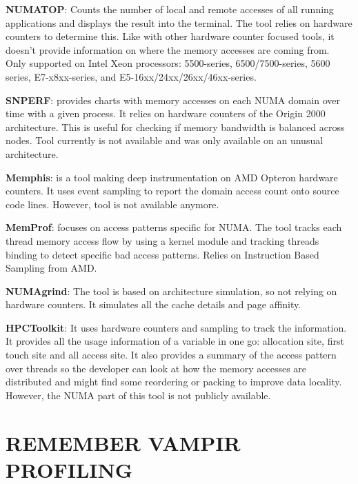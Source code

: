 \documentclass[a4paper,11pt]{article}
\begin{document}
\begin{description}
\item \textbf{NUMATOP}: Counts the number of local and remote accesses of all running applications and displays the result into the terminal. The tool relies on hardware counters to determine this. Like with other hardware counter focused tools, it doesn't provide information on where the memory accesses are coming from. Only supported on Intel Xeon processors: 5500-series, 6500/7500-series, 5600 series, E7-x8xx-series, and E5-16xx/24xx/26xx/46xx-series.
\item \textbf{SNPERF}: provides charts with memory accesses on each NUMA domain over time with a given process. It relies on hardware counters of the Origin 2000 architecture. This is useful for checking if memory bandwidth is balanced across nodes. Tool currently is not available and was only available on an unusual architecture.
\item \textbf{Memphis}: is a tool making deep instrumentation on AMD Opteron hardware counters. It uses event sampling to report the domain access count onto source code lines. However, tool is not available anymore.
\item \textbf{MemProf}: focuses on access patterns specific for NUMA. The tool tracks each thread memory access flow by using a kernel module and tracking threads binding to detect specific bad access patterns. Relies on Instruction Based Sampling from AMD.
\item \textbf{NUMAgrind}: The tool is based on architecture simulation, so not relying on hardware counters. It simulates all the cache details and page affinity.
\item \textbf{HPCToolkit}: It uses hardware counters and sampling to track the information. It provides all the usage information of a variable in one go: allocation
site, first touch site and all access site. It also provides a summary of the access
pattern over threads so the developer can look at how the memory accesses are
distributed and might find some reordering or packing to improve data locality. However, the NUMA part of this tool is not publicly available.
\end{description}

\section{REMEMBER VAMPIR PROFILING}
\end{document}
